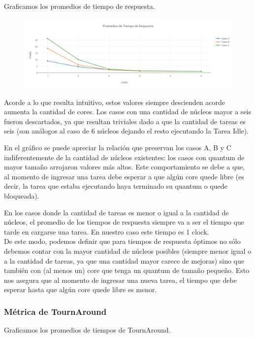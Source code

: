 \documentclass[a4paper]{article}
\begin{document}
Graficamos los promedios de tiempo de respuesta.
		 \begin{figure}[h!]
   \begin{center}
 	\includegraphics[scale=1.2]{imagenes/ej7/TiemposResp.png}
   \end{center}
 \end{figure} 
 
 Acorde a lo que resulta intuitivo, estos valores siempre descienden acorde aumenta la cantidad de cores. Los casos con una cantidad de n\'ucleos mayor a seis fueron descartados, ya que resultan triviales dado a que la cantidad de tareas es seis (son an\'alogos al caso de 6 n\'ucleos dejando el resto ejecutando la Tarea Idle).
 
 En el gr\'afico se puede apreciar la relaci\'on que preservan los casos A, B y C indiferentemente de la cantidad de n\'ucleos existentes: los casos con quantum de mayor tama\~no arrojaron valores m\'as altos. Este comportamiento se debe a que, al momento de ingresar una tarea debe esperar a que alg\'un core quede libre (es decir, la tarea que estaba ejecutando haya terminado su quantum o quede bloqueada).
 
 En los casos donde la cantidad de tareas es menor o igual a la cantidad de n\'ucleos, el promedio de los tiempos de respuesta siempre va a ser el tiempo que tarde en cargarse una tarea. En nuestro caso este tiempo es 1 clock.\\
 
 De este modo, podemos definir que para tiempos de respuesta \'optimos no s\'olo debemos contar con la mayor cantidad de n\'ucleos posibles (siempre menor igual o a la cantidad de tareas, ya que una cantidad mayor carece de mejoras) sino que tambi\'en con (al menos un) core que tenga un quantum de tama\~no peque\~no. Esto nos asegura que al momento de ingresar una nueva tarea, el tiempo que debe esperar hasta que alg\'un core quede libre es menor.

\newpage

\subsubsection*{M\'etrica de TournAround}
Graficamos los promedios de tiempos de TournAround.
\end{document}
